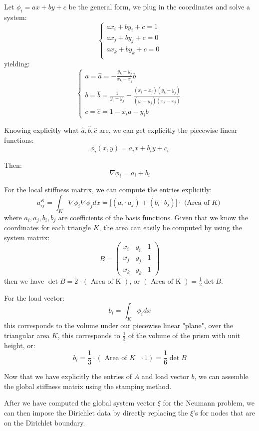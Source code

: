 \documentclass[12pt]{article} %
\begin{document}
Let $\phi_{i} = ax + by + c$ be the general form, we plug in the coordinates and solve a system:
$$
\begin{cases}
	ax_{i}+by_{i}+c = 1 \\
	ax_{j}+by_{j}+c = 0 \\
	ax_{k}+by_{k}+c = 0 \\
\end{cases}
$$ yielding:
$$
	\begin{cases}
		a = \hat{a} = -\frac{y_k-y_j}{x_k-x_j}b\\
		b = \hat{b} = \frac{1}{y_i-y_j} + \frac{(x_i-x_j)(y_k-y_j)}{(y_i-y_j)(x_k-x_j)} \\
		c = \hat{c} = 1-x_ia - y_ib
	\end{cases}
$$

Knowing explicitly what $\hat{a},\hat{b},\hat{c}$ are, we can get explicitly the piecewise linear functions:
$$
	\phi_i(x,y) = a_ix+b_iy+c_i
$$

Then:
$$
	\nabla \phi_{i} = a_i + b_i
$$

For the local stiffness matrix, we can compute the entries explicitly:
$$
	a_{ij}^{K} = \int_{K}\nabla\phi_{i}\nabla\phi_{j}dx = \big[(a_i \cdot a_j)+(b_i \cdot b_j)\big]\cdot \text{ (Area of $K$) }
$$ where $a_i,a_j,b_i,b_j$ are coefficients of the basis functions. Given that we know the coordinates for each triangle $K$, the area can easily be computed by using the system matrix:
$$
	B = 
	\begin{pmatrix}
		x_i & y_i & 1 \\
		x_j & y_j & 1 \\
		x_k & y_k & 1
	\end{pmatrix}
$$ then we have $\det B = 2\cdot(\text{ Area of K } )$, or $(\text{ Area of K }) = \frac12 \det B$.

For the load vector:
$$
	b_i = \int_{K} \phi_i dx
$$ this corresponds to the volume under our piecewise linear "plane", over the triangular area $K$, this corresponds to $\frac13$ of the volume of the prism with unit height, or:
$$
	b_i = \frac13\cdot (\text{ Area of $K$ } \cdot 1) = \frac16 \det B
$$

Now that we have explicitly the entries of $A$ and load vector $b$, we can assemble the global stiffness matrix using the stamping method.

After we have computed the global system vector $\xi$ for the Neumann problem, we can then impose the Dirichlet data by directly replacing the $\xi$'s for nodes that are on the Dirichlet boundary.
\end{document}
